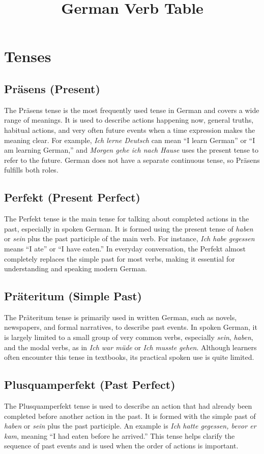 \documentclass[10pt,a4paper]{revtex4-2}
\title{German Verb Table}
\begin{document}
\tableofcontents


\section{Tenses}

\subsection{Präsens (Present)}
The Präsens tense is the most frequently used tense in German and covers a wide range of meanings. It is used to describe actions happening now, general truths, habitual actions, and very often future events when a time expression makes the meaning clear. For example, \textit{Ich lerne Deutsch} can mean “I learn German” or “I am learning German,” and \textit{Morgen gehe ich nach Hause} uses the present tense to refer to the future. German does not have a separate continuous tense, so Präsens fulfills both roles.

\subsection{Perfekt (Present Perfect)}
The Perfekt tense is the main tense for talking about completed actions in the past, especially in spoken German. It is formed using the present tense of \textit{haben} or \textit{sein} plus the past participle of the main verb. For instance, \textit{Ich habe gegessen} means “I ate” or “I have eaten.” In everyday conversation, the Perfekt almost completely replaces the simple past for most verbs, making it essential for understanding and speaking modern German.

\subsection{Präteritum (Simple Past)}
The Präteritum tense is primarily used in written German, such as novels, newspapers, and formal narratives, to describe past events. In spoken German, it is largely limited to a small group of very common verbs, especially \textit{sein}, \textit{haben}, and the modal verbs, as in \textit{Ich war müde} or \textit{Ich musste gehen}. Although learners often encounter this tense in textbooks, its practical spoken use is quite limited.

\subsection{Plusquamperfekt (Past Perfect)}
The Plusquamperfekt tense is used to describe an action that had already been completed before another action in the past. It is formed with the simple past of \textit{haben} or \textit{sein} plus the past participle. An example is \textit{Ich hatte gegessen, bevor er kam}, meaning “I had eaten before he arrived.” This tense helps clarify the sequence of past events and is used when the order of actions is important.
\end{document}
